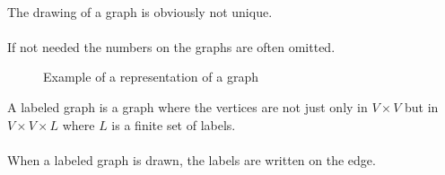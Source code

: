 \paragraph{}
The drawing of a graph is obviously not unique.

\paragraph{}
If not needed the numbers on the graphs are often omitted.


\begin{figure}[H]
  \begin{center}
    \caption{Example of a representation of a graph}
  \end{center}
\end{figure}

\begin{definition}
  A labeled graph is a graph where the vertices are not just only in $V \times V$ but in $V \times V \times L$ where $L$ is a finite set of labels.
\end{definition}

\paragraph{}
When a labeled graph is drawn, the labels are written on the edge.


